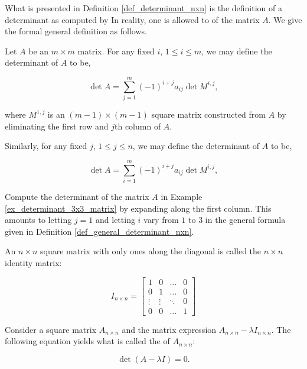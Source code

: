 What is presented in Definition \ref{def_determinant_nxn} is the definition of a determinant as computed by   In reality, one is allowed to  of the matrix $A$.  We give the formal general definition as follows.

{Let $A$ be an $m\times m$ matrix.  For any fixed $i$, $1\leq i\leq m$,  we may define the determinant of $A$ to be,
 
\[\det A = \sum_{j=1}^m (-1)^{i+j} a_{ij}\det M^{i,j},\]

\noindent where $M^{1,j}$ is an $(m-1)\times (m-1)$ square matrix constructed from $A$ by eliminating the first row and $j$th column of $A$.

Similarly, for any fixed $j$, $1\leq j\leq n$, we may define the determinant of $A$ to be,

\[\det A = \sum_{i=1}^m (-1)^{i+j} a_{ij}\det M^{i,j},\]
}

{Compute the determinant of the matrix $A$ in Example \ref{ex_determinant_3x3_matrix} by expanding along the first column.}
{This amounts to letting $j=1$ and letting $i$ vary from $1$ to $3$ in the general formula given in Definition \ref{def_general_determinant_nxn}.}


An $n\times n$ square matrix with only ones along the diagonal is called the $n\times n$ identity matrix:

\[
I_{n\times n} = \begin{bmatrix}
	1 & 0 &\dots & 0\\
	0 & 1 &\dots & 0\\
	\vdots & \vdots & \ddots & 0\\
	0 & 0 &\dots & 1
\end{bmatrix}
\]

Consider a square matrix $A_{n\times n}$ and the matrix expression $A_{n\times n}-\lambda I_{n\times n}$.  The following equation yields what is called the  of  $A_{n \times n}$:

\[\det (A-\lambda I) = 0.\]

